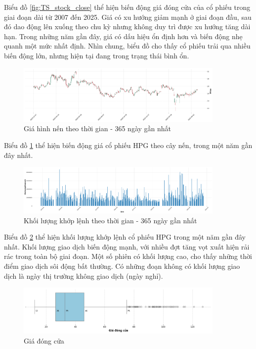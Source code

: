     Biểu đồ \ref{fig:TS_stock_close} thể hiện biến động giá đóng cửa của cổ phiếu trong giai đoạn dài từ 2007 đến 2025. Giá có xu hướng giảm mạnh ở giai đoạn đầu, sau đó dao động lên xuống theo chu kỳ nhưng không duy trì được xu hướng tăng dài hạn. Trong những năm gần đây, giá có dấu hiệu ổn định hơn và biến động nhẹ quanh một mức nhất định. Nhìn chung, biểu đồ cho thấy cổ phiếu trải qua nhiều biến động lớn, nhưng hiện tại đang trong trạng thái bình ổn.

    \begin{figure}[htp]
        \centering
        \includegraphics[width=0.90\textwidth]{images/TS_stock_close_candle_365.png}
        \caption{Giá hình nến theo thời gian - 365 ngày gần nhất}
        \label{fig:TS_stock_close_candle_365}
    \end{figure}
    \FloatBarrier

     Biểu đồ \ref{fig:TS_stock_close_candle_365} thể hiện biến động giá cổ phiếu HPG theo cây nến, trong một năm gần đây nhất. 

     \begin{figure}[htp]
        \centering
        \includegraphics[width=0.90\textwidth]{images/TS_stock_volumn_365.png}
        \caption{Khối lượng khớp lệnh theo thời gian - 365 ngày gần nhất}
        \label{fig:TS_stock_volumn_365}
    \end{figure}
    \FloatBarrier

    Biểu đồ \ref{fig:TS_stock_volumn_365} thể hiện khối lượng khớp lệnh cổ phiếu HPG trong một năm gần đây nhất. Khối lượng giao dịch biến động mạnh, với nhiều đợt tăng vọt xuất hiện rải rác trong toàn bộ giai đoạn. Một số phiên có khối lượng cao, cho thấy những thời điểm giao dịch sôi động bất thường. Có những đoạn không có khối lượng giao dịch là ngày thị trường không giao dịch (ngày nghỉ).

    \begin{figure}[htp]
        \centering
        \includegraphics[width=0.90\textwidth]{images/TS_stock_close_box.png}
        \caption{Giá đóng cửa}
        \label{fig:TS_stock_close_box}
    \end{figure}
    \FloatBarrier

